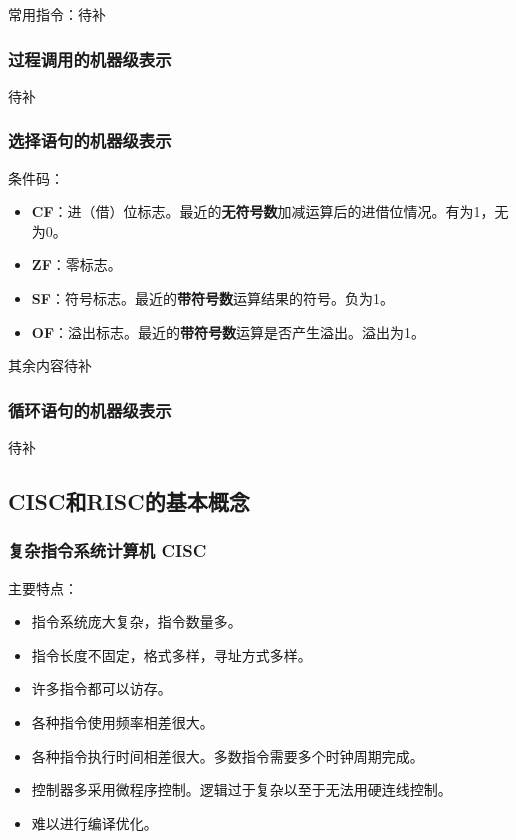 \documentclass[12pt, a4paper, oneside]{ctexart}
\begin{document}
常用指令：待补

\subsubsection{过程调用的机器级表示}

待补

\subsubsection{选择语句的机器级表示}

条件码：
\begin{itemize}
  \item {\bf CF}：进（借）位标志。最近的\textbf{无符号数}加减运算后的进借位情况。有为1，无为0。
  \item {\bf ZF}：零标志。
  \item {\bf SF}：符号标志。最近的\textbf{带符号数}运算结果的符号。负为1。
  \item {\bf OF}：溢出标志。最近的\textbf{带符号数}运算是否产生溢出。溢出为1。
\end{itemize}

其余内容待补

\subsubsection{循环语句的机器级表示}

待补

\subsection{CISC和RISC的基本概念}

\subsubsection{复杂指令系统计算机 CISC}

主要特点：
\begin{itemize}
  \item 指令系统庞大复杂，指令数量多。
  \item 指令长度不固定，格式多样，寻址方式多样。
  \item 许多指令都可以访存。
  \item 各种指令使用频率相差很大。
  \item 各种指令执行时间相差很大。多数指令需要多个时钟周期完成。
  \item 控制器多采用微程序控制。逻辑过于复杂以至于无法用硬连线控制。
  \item 难以进行编译优化。
\end{itemize}
\end{document}
